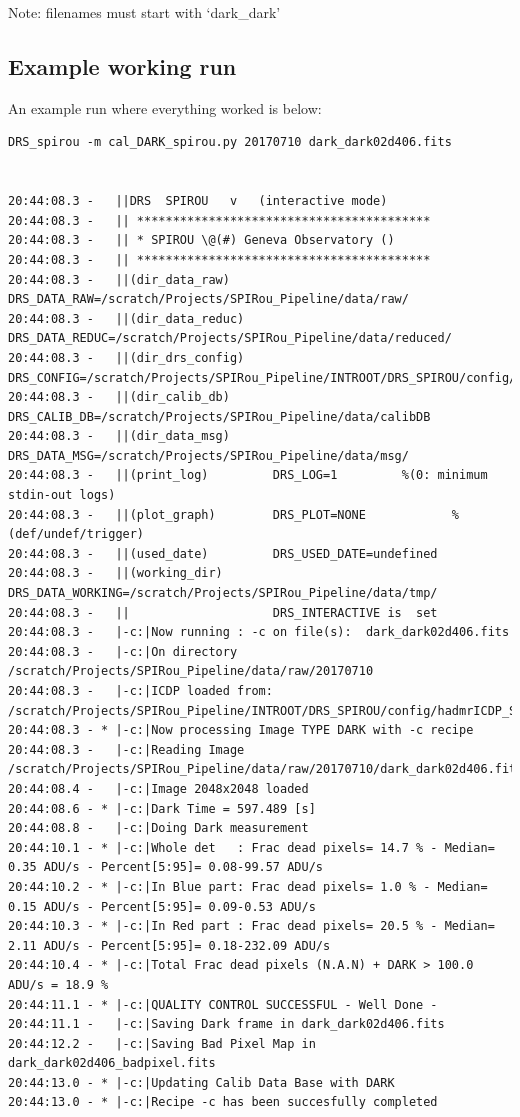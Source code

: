 \noindent Note: filenames must start with `dark\_dark'

\subsection{Example working run}

An example run where everything worked is below:

\begin{lstlisting}[style=text]
DRS_spirou -m cal_DARK_spirou.py 20170710 dark_dark02d406.fits


20:44:08.3 -   ||DRS  SPIROU   v   (interactive mode)
20:44:08.3 -   || *****************************************
20:44:08.3 -   || * SPIROU \@(#) Geneva Observatory ()
20:44:08.3 -   || *****************************************
20:44:08.3 -   ||(dir_data_raw)      DRS_DATA_RAW=/scratch/Projects/SPIRou_Pipeline/data/raw/
20:44:08.3 -   ||(dir_data_reduc)    DRS_DATA_REDUC=/scratch/Projects/SPIRou_Pipeline/data/reduced/
20:44:08.3 -   ||(dir_drs_config)    DRS_CONFIG=/scratch/Projects/SPIRou_Pipeline/INTROOT/DRS_SPIROU/config/
20:44:08.3 -   ||(dir_calib_db)      DRS_CALIB_DB=/scratch/Projects/SPIRou_Pipeline/data/calibDB
20:44:08.3 -   ||(dir_data_msg)      DRS_DATA_MSG=/scratch/Projects/SPIRou_Pipeline/data/msg/
20:44:08.3 -   ||(print_log)         DRS_LOG=1         %(0: minimum stdin-out logs)
20:44:08.3 -   ||(plot_graph)        DRS_PLOT=NONE            %(def/undef/trigger)
20:44:08.3 -   ||(used_date)         DRS_USED_DATE=undefined
20:44:08.3 -   ||(working_dir)       DRS_DATA_WORKING=/scratch/Projects/SPIRou_Pipeline/data/tmp/
20:44:08.3 -   ||                    DRS_INTERACTIVE is  set
20:44:08.3 -   |-c:|Now running : -c on file(s):  dark_dark02d406.fits
20:44:08.3 -   |-c:|On directory /scratch/Projects/SPIRou_Pipeline/data/raw/20170710
20:44:08.3 -   |-c:|ICDP loaded from: /scratch/Projects/SPIRou_Pipeline/INTROOT/DRS_SPIROU/config/hadmrICDP_SPIROU.py
20:44:08.3 - * |-c:|Now processing Image TYPE DARK with -c recipe
20:44:08.3 -   |-c:|Reading Image /scratch/Projects/SPIRou_Pipeline/data/raw/20170710/dark_dark02d406.fits
20:44:08.4 -   |-c:|Image 2048x2048 loaded
20:44:08.6 - * |-c:|Dark Time = 597.489 [s]
20:44:08.8 -   |-c:|Doing Dark measurement
20:44:10.1 - * |-c:|Whole det   : Frac dead pixels= 14.7 % - Median= 0.35 ADU/s - Percent[5:95]= 0.08-99.57 ADU/s
20:44:10.2 - * |-c:|In Blue part: Frac dead pixels= 1.0 % - Median= 0.15 ADU/s - Percent[5:95]= 0.09-0.53 ADU/s
20:44:10.3 - * |-c:|In Red part : Frac dead pixels= 20.5 % - Median= 2.11 ADU/s - Percent[5:95]= 0.18-232.09 ADU/s
20:44:10.4 - * |-c:|Total Frac dead pixels (N.A.N) + DARK > 100.0 ADU/s = 18.9 %
20:44:11.1 - * |-c:|QUALITY CONTROL SUCCESSFUL - Well Done -
20:44:11.1 -   |-c:|Saving Dark frame in dark_dark02d406.fits                                                                                      
20:44:12.2 -   |-c:|Saving Bad Pixel Map in dark_dark02d406_badpixel.fits                                                                            
20:44:13.0 - * |-c:|Updating Calib Data Base with DARK                                                                                                  
20:44:13.0 - * |-c:|Recipe -c has been succesfully completed


\end{lstlisting}
